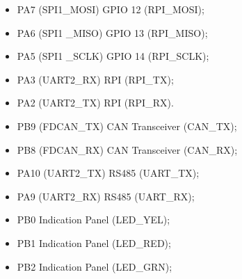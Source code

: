 \begin{itemize}
    \item PA7 (SPI1\_MOSI) \rightarrow GPIO 12 (RPI\_MOSI);
    \item PA6 (SPI1 \_MISO) \rightarrow GPIO 13 (RPI\_MISO);
    \item PA5 (SPI1 \_SCLK) \rightarrow GPIO 14 (RPI\_SCLK);
    \item PA3 (UART2\_RX) \rightarrow RPI (RPI\_TX);
    \item PA2 (UART2\_TX) \rightarrow RPI (RPI\_RX).
\end{itemize}


\begin{itemize}
    \item PB9 (FDCAN\_TX) \rightarrow CAN Transceiver (CAN\_TX);
    \item PB8 (FDCAN\_RX) \rightarrow CAN Transceiver (CAN\_RX);
\end{itemize}

\begin{itemize}
    \item PA10 (UART2\_TX) \rightarrow RS485 (UART\_TX);
    \item PA9 (UART2\_RX) \rightarrow RS485 (UART\_RX);
\end{itemize}


\begin{itemize}
    \item PB0 \leftarrow Indication Panel (LED\_YEL);
    \item PB1 \leftarrow Indication Panel (LED\_RED);
    \item PB2 \leftarrow Indication Panel (LED\_GRN);
\end{itemize}



